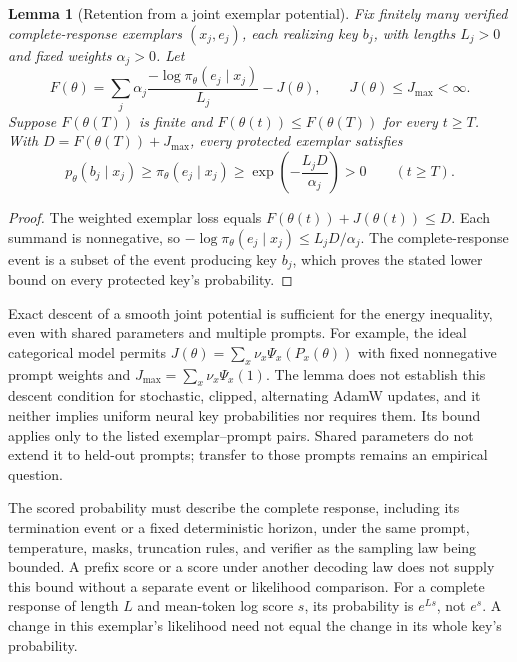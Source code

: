 \documentclass{article}
\newcommand{\1}{\mathbf 1}
\newtheorem{lemma}{Lemma}[section]
\theoremstyle{remark}
\theoremstyle{definition}
\theoremstyle{plain}
\begin{document}
\begin{lemma}[Retention from a joint exemplar potential]
\label{lem:shared-exemplar-retention}
Fix finitely many verified complete-response exemplars $(x_j,e_j)$, each
realizing key $b_j$, with lengths $L_j>0$ and fixed weights $\alpha_j>0$.
Let
\[
 F(\theta)=\sum_j\alpha_j
 \frac{-\log\pi_\theta(e_j\mid x_j)}{L_j}-J(\theta),
 \qquad J(\theta)\le J_{\max}<\infty.
\]
Suppose $F(\theta(T))$ is finite and
$F(\theta(t))\le F(\theta(T))$ for every $t\ge T$. With
$D=F(\theta(T))+J_{\max}$, every protected exemplar satisfies
\[
 p_\theta(b_j\mid x_j)\ge\pi_\theta(e_j\mid x_j)
 \ge\exp\!\left(-\frac{L_jD}{\alpha_j}\right)>0
 \qquad(t\ge T).
\]
\end{lemma}
\begin{proof}
The weighted exemplar loss equals $F(\theta(t))+J(\theta(t))\le D$.
Each summand is nonnegative, so
$-\log\pi_\theta(e_j\mid x_j)\le L_jD/\alpha_j$.
The complete-response event is a subset of the event producing key $b_j$,
which proves the stated lower bound on every protected key's probability.
\end{proof}

Exact descent of a smooth joint potential is sufficient for the energy
inequality, even with shared parameters and multiple prompts. For example,
the ideal categorical model permits
$J(\theta)=\sum_x\nu_x\Psi_x(P_x(\theta))$ with fixed nonnegative prompt
weights and $J_{\max}=\sum_x\nu_x\Psi_x(1)$. The lemma does not establish
this descent condition for stochastic, clipped, alternating AdamW updates,
and it neither implies uniform neural key probabilities nor requires them.
Its bound applies only to the listed exemplar--prompt pairs. Shared
parameters do not extend it to held-out prompts; transfer to those prompts
remains an empirical question.

The scored probability must describe the complete response, including its
termination event or a fixed deterministic horizon, under the same prompt,
temperature, masks, truncation rules, and verifier as the sampling law being
bounded. A prefix score or a score under another decoding law does not
supply this bound without a separate event or likelihood comparison.
For a complete response of length $L$ and mean-token log score $s$, its
probability is $e^{Ls}$, not $e^s$. A change in this exemplar's likelihood
need not equal the change in its whole key's probability.
\end{document}
